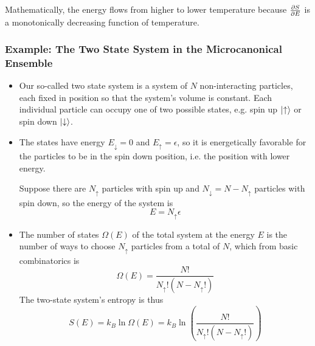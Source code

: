 \documentclass[11pt, a4paper]{article}
\begin{document}
\begin{itemize}
	Mathematically, the energy flows from higher to lower temperature because $ \pdv{S}{E} $ is a monotonically decreasing function of temperature.
\end{itemize}

\subsubsection{Example: The Two State System in the Microcanonical Ensemble} \label{sss:two_state_mce}
\begin{itemize}
	\item Our so-called two state system is a system of $ N $ non-interacting particles, each fixed in position so that the system's volume is constant. Each individual particle can occupy one of two possible states, e.g. spin up $ \ket{\uparrow} $ or spin down $ \ket{\downarrow} $. 
	
	\item The states have energy $ E_{\downarrow} = 0$ and $ E_{\uparrow} = \epsilon $, so it is energetically favorable for the particles to be in the spin down position, i.e. the position with lower energy. 
	
	Suppose there are $ N_{\uparrow} $ particles with spin up and $ N_{\downarrow} = N - N_{\uparrow}$ particles with spin down, so the energy of the system is 
	\begin{equation*}
		E = N_{\uparrow} \epsilon
	\end{equation*}
	
	\item The number of states $ \Omega(E) $ of the total system at the energy $ E $ is the number of ways to choose $ N_{\uparrow} $ particles from a total of $ N $, which from basic combinatorics is 
	\begin{equation*}
		\Omega(E) = \frac{N!}{N_{\uparrow}!(N - N_{\uparrow}!)}
	\end{equation*}
	The two-state system's entropy is thus
	\begin{equation*}
		S(E) = k_{B}\ln \Omega(E) = k_{B} \ln(\frac{N!}{N_{\uparrow}!(N - N_{\uparrow}!)})
	\end{equation*}
	

\end{itemize}
\end{document}
